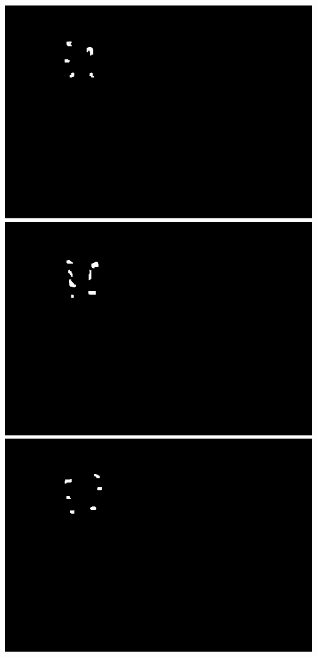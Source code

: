 \documentclass[]{article}
\begin{document}
\includegraphics{tapas-vignette_files/figure-latex/unnamed-chunk-9-7.pdf}
\includegraphics{tapas-vignette_files/figure-latex/unnamed-chunk-9-8.pdf}
\includegraphics{tapas-vignette_files/figure-latex/unnamed-chunk-9-9.pdf}
\end{document}

